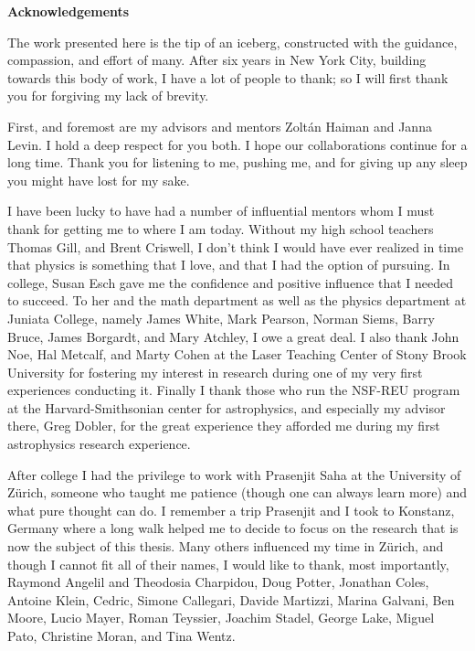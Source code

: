 \newpage

\begin{center}
    {\large \bf Acknowledgements }
\end{center}

\vspace{-0.6cm}


The work presented here is the tip of an iceberg, constructed with the
guidance, compassion, and effort of many. After six years in New York City,
building towards this body of work, I have a lot of people to thank; so I will
first thank you for forgiving my lack of brevity.


First, and foremost are my advisors and mentors Zolt\'an Haiman and Janna
Levin. I hold a deep respect for you both. I hope our collaborations continue
for a long time. Thank you for listening to me, pushing me, and for giving up
any sleep you might have lost for my sake.


I have been lucky to have had a number of influential mentors whom I must
thank for getting me to where I am today. Without my high school teachers
Thomas Gill, and Brent Criswell, I don't think I would have ever realized in
time that physics is something that I love, and that I had the option of
pursuing. In college, Susan Esch gave me the confidence and positive influence
that I needed to succeed. To her and the math department as well as the
physics department at Juniata College, namely James White, Mark Pearson,
Norman Siems, Barry Bruce, James Borgardt, and Mary Atchley, I owe a great
deal. I also thank John Noe, Hal Metcalf, and Marty Cohen at the Laser
Teaching Center of Stony Brook University for fostering my interest in
research during one of my very first experiences conducting it. Finally I
thank those who run the NSF-REU program at the Harvard-Smithsonian center for
astrophysics, and especially my advisor there, Greg Dobler, for the great
experience they afforded me during my first astrophysics research experience.



After college I had the privilege to work with Prasenjit Saha at the
University of Z\"urich, someone who taught me patience (though one can always
learn more) and what pure thought can do. I remember a trip Prasenjit and I
took to Konstanz, Germany where a long walk helped me to decide to focus on
the research that is now the subject of this thesis. Many others influenced my
time in Z\"urich, and though I cannot fit all of their names, I would like to
thank, most importantly, Raymond Angelil and Theodosia Charpidou,  Doug
Potter, Jonathan Coles, Antoine Klein, Cedric, Simone Callegari, Davide
Martizzi, Marina Galvani, Ben Moore, Lucio Mayer, Roman Teyssier, Joachim
Stadel, George Lake, Miguel Pato, Christine Moran, and Tina Wentz.

